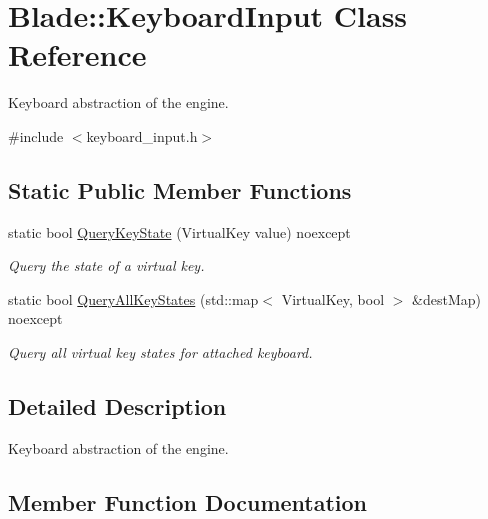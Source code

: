 \hypertarget{class_blade_1_1_keyboard_input}{}\section{Blade\+:\+:Keyboard\+Input Class Reference}
\label{class_blade_1_1_keyboard_input}


Keyboard abstraction of the engine.  




{\ttfamily \#include $<$keyboard\+\_\+input.\+h$>$}

\subsection*{Static Public Member Functions}
\begin{DoxyCompactItemize}
\item 
static bool \hyperlink{class_blade_1_1_keyboard_input_a9430c44501f4c2a4c3550be2b4bc05d0}{Query\+Key\+State} (Virtual\+Key value) noexcept
\begin{DoxyCompactList}\small\item\em Query the state of a virtual key. \end{DoxyCompactList}\item 
static bool \hyperlink{class_blade_1_1_keyboard_input_acf01cd89bda99e5508dbe7560447651c}{Query\+All\+Key\+States} (std\+::map$<$ Virtual\+Key, bool $>$ \&dest\+Map) noexcept
\begin{DoxyCompactList}\small\item\em Query all virtual key states for attached keyboard. \end{DoxyCompactList}\end{DoxyCompactItemize}


\subsection{Detailed Description}
Keyboard abstraction of the engine. 

\subsection{Member Function Documentation}
\mbox{\label{class_blade_1_1_keyboard_input_acf01cd89bda99e5508dbe7560447651c}} 
